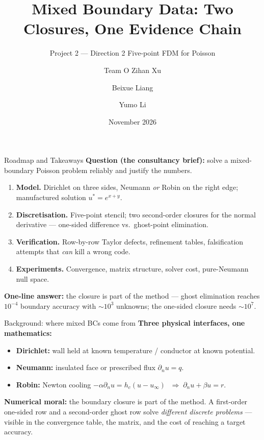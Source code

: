 \documentclass[aspectratio=169,11pt]{beamer}
\title{Mixed Boundary Data: Two Closures, One Evidence Chain}
\subtitle{Project 2 --- Direction 2 \quad Five-point FDM for Poisson}
\author{Team O \quad Zihan Xu \and Beixue Liang \and Yumo Li}
\institute{MTH321 Numerical Analysis of ODEs and PDEs}
\date{November 2026}
\begin{document}
\begin{frame}
\titlepage
\end{frame}

\begin{frame}{Roadmap and Takeaways}
\textbf{Question (the consultancy brief):} solve a mixed-boundary Poisson
problem reliably and justify the numbers.

\bigskip
\begin{enumerate}
\item \textbf{Model.} Dirichlet on three sides, Neumann \emph{or} Robin on
      the right edge; manufactured solution $u^\ast=e^{x+y}$.
\item \textbf{Discretisation.} Five-point stencil; \alert{two} second-order
      closures for the normal derivative --- one-sided difference vs.\
      ghost-point elimination.
\item \textbf{Verification.} Row-by-row Taylor defects, refinement tables,
      falsification attempts that \emph{can} kill a wrong code.
\item \textbf{Experiments.} Convergence, matrix structure, solver cost,
      pure-Neumann null space.
\end{enumerate}

\bigskip
\textbf{One-line answer:} the closure is part of the method --- ghost
elimination reaches $10^{-4}$ boundary accuracy with $\sim\!10^{3}$
unknowns; the one-sided closure needs $\sim\!10^{7}$.
\end{frame}

\begin{frame}{Background: where mixed BCs come from}
\textbf{Three physical interfaces, one mathematics:}
\begin{itemize}
\item \textbf{Dirichlet:} wall held at known temperature / conductor at
      known potential.
\item \textbf{Neumann:} insulated face or prescribed flux
      $\partial_n u = q$.
\item \textbf{Robin:} Newton cooling $-\alpha\partial_n u = h_c(u-u_\infty)$
      $\;\Rightarrow\; \partial_n u + \beta u = r$.
\end{itemize}

\bigskip
\textbf{Numerical moral:} the boundary closure is part of the method.
A first-order one-sided row and a second-order ghost row solve
\emph{different discrete problems} --- visible in the convergence table,
the matrix, and the cost of reaching a target accuracy.
\end{frame}
\end{document}
